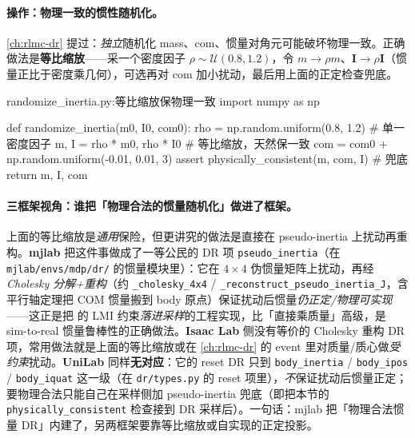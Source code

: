 \paragraph{操作：物理一致的惯性随机化。}\cref{ch:rlmc-dr} 提过：\emph{独立}随机化 mass、com、惯量对角元可能破坏物理一致。正确做法是\textbf{等比缩放}——采一个密度因子 $\rho\sim\mathcal{U}(0.8,1.2)$，令 $m\!\to\!\rho m$、$\mathbf{I}\!\to\!\rho\mathbf{I}$（惯量正比于密度乘几何），可选再对 com 加小扰动，最后用上面的正定检查兜底。

\begin{codebox}[Python]{randomize\_inertia.py:等比缩放保物理一致}
import numpy as np

def randomize_inertia(m0, I0, com0):
    rho = np.random.uniform(0.8, 1.2)        # 单一密度因子
    m, I = rho * m0, rho * I0                 # 等比缩放，天然保一致
    com = com0 + np.random.uniform(-0.01, 0.01, 3)
    assert physically_consistent(m, com, I)  # 兜底
    return m, I, com
\end{codebox}

\paragraph{三框架视角：谁把「物理合法的惯量随机化」做进了框架。}上面的等比缩放是\emph{通用}保险，但更讲究的做法是直接在 pseudo-inertia 上扰动再重构。\textbf{mjlab} 把这件事做成了一等公民的 DR 项 \texttt{pseudo\_inertia}（在 \texttt{mjlab/\allowbreak envs/\allowbreak mdp/\allowbreak dr/\allowbreak } 的惯量模块里）：它在 $4\times4$ 伪惯量矩阵上扰动，再经 \emph{Cholesky 分解+重构}（约 \texttt{\_cholesky\_4x4} / \texttt{\_reconstruct\_pseudo\_inertia\_J}，含平行轴定理把 COM 惯量搬到 body 原点）保证扰动后惯量\emph{仍正定/物理可实现}——这正是把 \cite{wensing2018lmi} 的 LMI 约束\emph{落进采样}的工程实现，比「直接乘质量」高级，是 sim-to-real 惯量鲁棒性的正确做法。\textbf{Isaac Lab} 侧没有等价的 Cholesky 重构 DR 项，常用做法就是上面的等比缩放或在 \cref{ch:rlmc-dr} 的 event 里对质量/质心做\emph{受约束}扰动。\textbf{UniLab} 同样\textbf{无对应}：它的 reset DR 只到 \texttt{body\_inertia} / \texttt{body\_ipos} / \texttt{body\_iquat} 这一级（在 \texttt{dr/types.py} 的 reset 项里），\emph{不}保证扰动后惯量正定；要物理合法只能自己在采样侧加 pseudo-inertia 兜底（即把本节的 \texttt{physically\_consistent} 检查接到 DR 采样后）。一句话：mjlab 把「物理合法惯量 DR」内建了，另两框架要靠等比缩放或自实现的正定投影。

